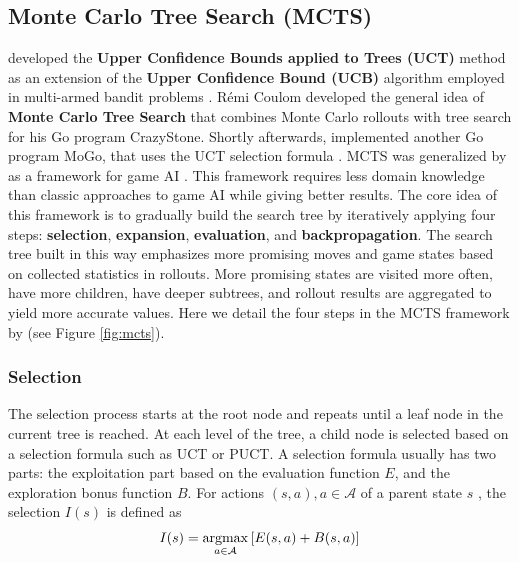 \subsection{Monte Carlo Tree Search (MCTS)} \label{sec:mcts}

\citeauthor{BanditBasedMonteCarlo_Kocsis.Szepesvari_2006} developed the \textbf{Upper Confidence Bounds applied to Trees (UCT)} method as an extension of the \textbf{Upper Confidence Bound (UCB)} algorithm employed in multi-armed bandit problems \cite{BanditBasedMonteCarlo_Kocsis.Szepesvari_2006}.
Rémi Coulom developed the general idea of \textbf{Monte Carlo Tree Search} that combines Monte Carlo rollouts with tree search \cite{EfficientSelectivityBackup_Coulom_2007} for his Go program CrazyStone.
Shortly afterwards,
\citeauthor{ModificationUCTPatterns_Gelly.Wang.ea_2006} implemented another Go program MoGo, that uses the UCT selection formula \cite{ModificationUCTPatterns_Gelly.Wang.ea_2006}.
MCTS was generalized by \citeauthor{MonteCarloTreeSearch_Chaslot.Bakkes.ea_2008} as a framework for game AI \cite{MonteCarloTreeSearch_Chaslot.Bakkes.ea_2008}.
This framework requires less domain knowledge than classic approaches to game AI while giving better results.
The core idea of this framework is to gradually build the search tree by iteratively applying four steps: \textbf{selection}, \textbf{expansion}, \textbf{evaluation}, and \textbf{backpropagation}.
The search tree built in this way emphasizes more promising moves and game states based on collected statistics in rollouts.
More promising states are visited more often, have more children, have deeper subtrees, and rollout results are aggregated to yield more accurate values. Here we detail the four steps in the MCTS framework by \citeauthor{MonteCarloTreeSearch_Chaslot.Bakkes.ea_2008} (see Figure \ref{fig:mcts}).


\subsubsection{Selection}
The selection process starts at the root node and repeats until a leaf node in the current tree is reached.
At each level of the tree, a child node is selected based on a selection formula such as UCT or PUCT.
A selection formula usually has two parts: the exploitation part based on the evaluation function $E$, and the exploration bonus function $B$.
For actions $(s, a), a \in \mathcal{A}$ of a parent state $s$ , the selection $I(s)$ is defined as
\begin{align*}
    \label{eq:mcts_selection}
    I(s) = \operatorname*{argmax}_{a \in \mathcal{A}}{\left[ E(s, a) + B(s, a) \right]}
\end{align*}

